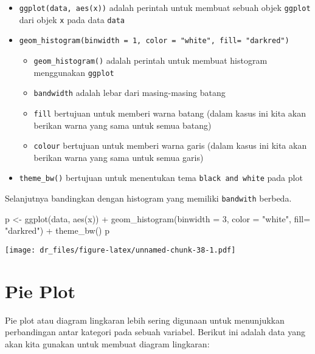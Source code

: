 \documentclass[
]{book}
\newenvironment{Shaded}{\begin{snugshade}}{\end{snugshade}}
\newcommand{\AttributeTok}[1]{\textcolor[rgb]{0.77,0.63,0.00}{#1}}
\newcommand{\DecValTok}[1]{\textcolor[rgb]{0.00,0.00,0.81}{#1}}
\newcommand{\FunctionTok}[1]{\textcolor[rgb]{0.00,0.00,0.00}{#1}}
\newcommand{\NormalTok}[1]{#1}
\newcommand{\OtherTok}[1]{\textcolor[rgb]{0.56,0.35,0.01}{#1}}
\newcommand{\SpecialCharTok}[1]{\textcolor[rgb]{0.00,0.00,0.00}{#1}}
\newcommand{\StringTok}[1]{\textcolor[rgb]{0.31,0.60,0.02}{#1}}
\providecommand{\tightlist}{%
  \setlength{\itemsep}{0pt}\setlength{\parskip}{0pt}}
\begin{document}
\begin{itemize}
\tightlist
\item
  \texttt{ggplot(data,\ aes(x))} adalah perintah untuk membuat sebuah objek \texttt{ggplot} dari objek \texttt{x} pada data \texttt{data}
\item
  \texttt{geom\_histogram(binwidth\ =\ 1,\ color\ =\ "white",\ fill=\ "darkred")}

  \begin{itemize}
  \tightlist
  \item
    \texttt{geom\_histogram()} adalah perintah untuk membuat histogram menggunakan \texttt{ggplot}
  \item
    \texttt{bandwidth} adalah lebar dari masing-masing batang
  \item
    \texttt{fill} bertujuan untuk memberi warna batang (dalam kasus ini kita akan berikan warna yang sama untuk semua batang)
  \item
    \texttt{colour} bertujuan untuk memberi warna garis (dalam kasus ini kita akan berikan warna yang sama untuk semua garis)
  \end{itemize}
\item
  \texttt{theme\_bw()} bertujuan untuk menentukan tema \texttt{black\ and\ white} pada plot
\end{itemize}

Selanjutnya bandingkan dengan histogram yang memiliki \texttt{bandwith} berbeda.

\begin{Shaded}
\begin{Highlighting}[]
\NormalTok{p }\OtherTok{\textless{}{-}} \FunctionTok{ggplot}\NormalTok{(data, }\FunctionTok{aes}\NormalTok{(x)) }\SpecialCharTok{+} 
  \FunctionTok{geom\_histogram}\NormalTok{(}\AttributeTok{binwidth =} \DecValTok{3}\NormalTok{, }
                 \AttributeTok{color =} \StringTok{"white"}\NormalTok{, }
                 \AttributeTok{fill=} \StringTok{"darkred"}\NormalTok{) }\SpecialCharTok{+}
  \FunctionTok{theme\_bw}\NormalTok{()}
\NormalTok{p}
\end{Highlighting}
\end{Shaded}

\texttt{[image: dr\_files/figure-latex/unnamed-chunk-38-1.pdf]}

\hypertarget{pie-plot}{%
\section{Pie Plot}\label{pie-plot}}

Pie plot atau diagram lingkaran lebih sering digunaan untuk menunjukkan perbandingan antar kategori pada sebuah variabel. Berikut ini adalah data yang akan kita gunakan untuk membuat diagram lingkaran:
\end{document}

